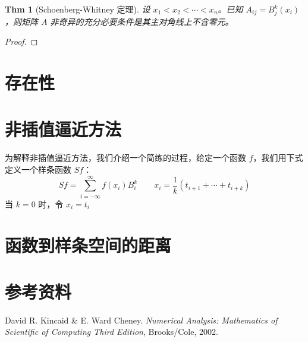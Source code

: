 \documentclass[a4paper]{article}
\newtheorem{theorem}{Thm}
\begin{document}
    
    \begin{theorem}[Schoenberg-Whitney 定理]
    \label{theorem-Schoenberg-Whitney}
        设 $x_1 < x_2 < \cdots < x_n$。已知 $A_{ij} = B_j^k (x_i)$，则矩阵 $A$ 非奇异的充分必要条件是其主对角线上不含零元。
    \end{theorem}
    \begin{proof}[Proof]
        
    \end{proof}
    
        
\section{存在性}


\section{非插值逼近方法}
    为解释非插值逼近方法，我们介绍一个简练的过程，给定一个函数 $f$，我们用下式定义一个样条函数 $Sf$：
    \begin{equation}
        Sf = \sum_{i = -\infty}^{\infty} f(x_i) B_i^k \qquad x_i = \frac{1}{k} (t_{i+1} + \cdots + t_{i+k})
    \end{equation}
    当 $k = 0$ 时，令 $x_i = t_i$

\section{函数到样条空间的距离}
    

\section{参考资料}
	\noindent [1] David R. Kincaid \& E. Ward Cheney. {\it Numerical Analysis: Mathematics of Scientific of Computing Third Edition}, Brooks/Cole, 2002.
	
\end{document}
